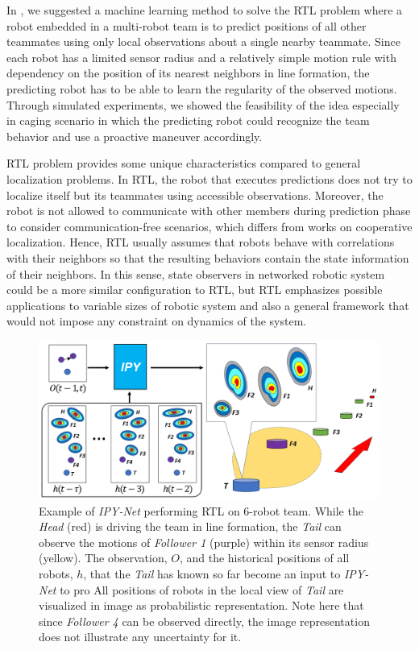 \documentclass[letterpaper, 10 pt, conference]{ieeeconf}  %
\begin{document}
	In \cite{Choi17}, we suggested a machine learning method to solve the 
	RTL problem where a robot embedded in a multi-robot team is to predict 
	positions of all other teammates using only local observations about a single nearby teammate. 
	Since each robot has a limited sensor radius and a relatively simple motion rule with dependency 
	on the position of its nearest neighbors in line formation, 
	the predicting robot has to be able to learn the regularity 
	of the observed motions. Through simulated experiments, we showed the feasibility of the idea 
	especially in caging scenario in which the predicting robot could recognize the team behavior and 
	use a proactive maneuver accordingly. 
	
	RTL problem provides some unique characteristics compared to general localization problems. 
	In RTL, the robot that executes predictions does not try to localize itself but its teammates using 
	accessible observations. 
	Moreover, the robot is not allowed to communicate with other members during prediction phase to 
	consider communication-free scenarios, which differs from works on cooperative localization. 
	Hence, RTL usually assumes that robots behave with correlations with their neighbors so that 
	the resulting behaviors contain the state information of their neighbors. 	
	In this sense, state observers in networked robotic system could be a more similar 
	configuration to RTL, but RTL emphasizes 
	possible applications to variable sizes of robotic system and also a general framework 
	that would not impose any constraint on dynamics of the system.
	
	\begin{figure}\centering
		\includegraphics[width=1.\columnwidth]{fig_Concept}
		\caption{Example of \emph{IPY-Net} performing RTL on $6$-robot team. 
			While the \emph{Head} (red) is driving 
			the team in line formation, the \emph{Tail} can observe the motions of 
			\emph{Follower 1} (purple) within its sensor radius (yellow).
			The observation, $O$, and the historical positions of all robots, $h$, that
			the \emph{Tail} has known so far become an input to \emph{IPY-Net} to pro 
			All positions of robots in the local view of \emph{Tail} are visualized in 
			image as probabilistic representation. Note here that since \emph{Follower 4} 
			can be observed directly, the image representation does not illustrate any
			uncertainty for it. 
		}
		\label{fig:Concept}
	\end{figure}
	
\end{document}
